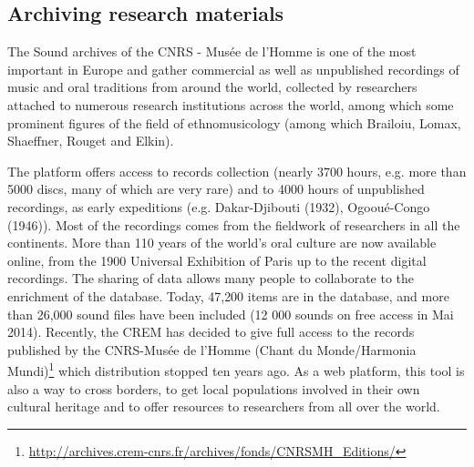 \documentclass{sig-alternate}
\begin{document}
\subsection{Archiving research materials}
The Sound archives of the CNRS - Musée de l'Homme is one of the most important in Europe and gather commercial as well as unpublished recordings of music and oral traditions from around the world, collected by researchers attached to numerous research institutions across the world, among which some prominent figures of the field of ethnomusicology (among which Brailoiu, Lomax, Shaeffner, Rouget and Elkin). 

The platform offers access to records collection (nearly 3700 hours, e.g. more than 5000 discs, many of which are very rare) and to 4000 hours of unpublished recordings, as early expeditions (e.g. Dakar-Djibouti (1932), Ogooué-Congo (1946)). Most of the recordings comes from the fieldwork of researchers in all the continents. 
More than 110 years of the world's oral culture are now available online, from the 1900 Universal Exhibition of Paris up to the recent digital recordings. The sharing of data allows many people to collaborate to the enrichment of the database. Today, 47,200 items are in the database, and more than 26,000 sound files have been included (12 000 sounds on free access in Mai 2014). Recently, the CREM has decided to give full access to the records published by the CNRS-Musée de l’Homme (Chant du Monde/Harmonia Mundi)\footnote{\url{http://archives.crem-cnrs.fr/archives/fonds/CNRSMH_Editions/}} which distribution stopped ten years ago.
As a web platform, this tool is also a way to cross borders, to get local populations involved in their own cultural heritage and to offer resources to researchers from all over the world.
\end{document}
